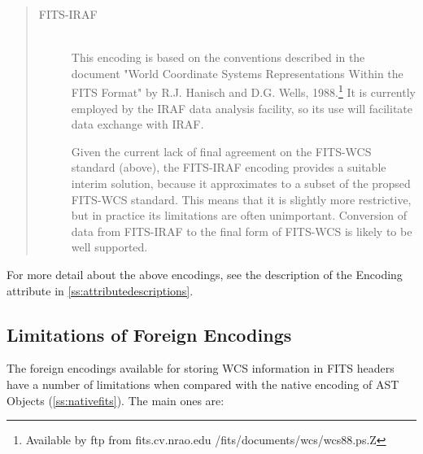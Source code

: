 \documentclass[twoside,11pt]{article}
\newcommand{\appref}[1]{Appendix~\ref{#1}}
\newcommand{\secref}[1]{\S\ref{#1}}
\renewcommand{\appref}[1]{\ref{#1}}
\renewcommand{\secref}[1]{\ref{#1}}
\begin{document}
\begin{quote}
\begin{description}
\item[FITS-IRAF]\mbox{}\\
This encoding is based on the conventions described in the document
"World Coordinate Systems Representations Within the FITS Format" by
R.J. Hanisch and D.G. Wells, 1988.\footnote{Available by ftp from
fits.cv.nrao.edu /fits/documents/wcs/wcs88.ps.Z} It is currently
employed by the IRAF data analysis facility, so its use will
facilitate data exchange with IRAF.

Given the current lack of final agreement on the FITS-WCS standard
(above), the FITS-IRAF encoding provides a suitable interim solution,
because it approximates to a subset of the propsed FITS-WCS standard.
This means that it is slightly more restrictive, but in practice its
limitations are often unimportant. Conversion of data from FITS-IRAF
to the final form of FITS-WCS is likely to be well supported.
\end{description}
\end{quote}

For more detail about the above encodings, see the description of the
Encoding attribute in \appref{ss:attributedescriptions}.

\subsection{\label{ss:foreignfitslimitations}Limitations of Foreign Encodings}

The foreign encodings available for storing WCS information in FITS
headers have a number of limitations when compared with the native
encoding of AST Objects (\secref{ss:nativefits}). The main ones are:
\end{document}
